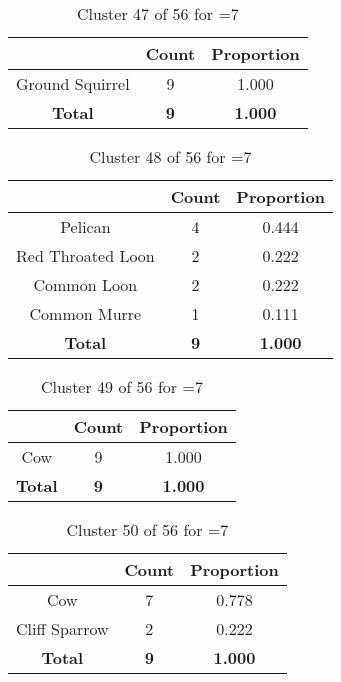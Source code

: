 \begin{table}[ht!]
\centering
\begin{tabular}{|c|c|c|}
\hline
\bf \Spec{} &\bf Count &\bf Proportion\\ \hline \hline
Ground Squirrel & 9 & 1.000\\ \hline
\hline
\bf Total & \bf 9 & \bf 1.000\\ \hline
\end{tabular}
\label{tab:cluster:47:7}
\caption{Cluster 47 of 56 for \minneigh{}=7}
\end{table}

\begin{table}[ht!]
\centering
\begin{tabular}{|c|c|c|}
\hline
\bf \Spec{} &\bf Count &\bf Proportion\\ \hline \hline
Pelican & 4 & 0.444\\ \hline
Red Throated Loon & 2 & 0.222\\ \hline
Common Loon & 2 & 0.222\\ \hline
Common Murre & 1 & 0.111\\ \hline
\hline
\bf Total & \bf 9 & \bf 1.000\\ \hline
\end{tabular}
\label{tab:cluster:48:7}
\caption{Cluster 48 of 56 for \minneigh{}=7}
\end{table}

\begin{table}[ht!]
\centering
\begin{tabular}{|c|c|c|}
\hline
\bf \Spec{} &\bf Count &\bf Proportion\\ \hline \hline
Cow & 9 & 1.000\\ \hline
\hline
\bf Total & \bf 9 & \bf 1.000\\ \hline
\end{tabular}
\label{tab:cluster:49:7}
\caption{Cluster 49 of 56 for \minneigh{}=7}
\end{table}

\clearpage
\begin{table}[ht!]
\centering
\begin{tabular}{|c|c|c|}
\hline
\bf \Spec{} &\bf Count &\bf Proportion\\ \hline \hline
Cow & 7 & 0.778\\ \hline
Cliff Sparrow & 2 & 0.222\\ \hline
\hline
\bf Total & \bf 9 & \bf 1.000\\ \hline
\end{tabular}
\label{tab:cluster:50:7}
\caption{Cluster 50 of 56 for \minneigh{}=7}
\end{table}

